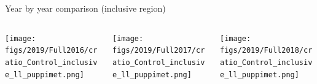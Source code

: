 \documentclass[9pt]{beamer}
\begin{document}
\begin{frame}{Year by year comparison (inclusive region)}
\begin{columns}
		\begin{column}{0.32\textwidth}
			\begin{center}
     			\texttt{[image: figs/2019/Full2016/cratio\_Control\_inclusive\_ll\_puppimet.png]}
    		\end{center}		
		\end{column} \hfill
		\begin{column}{0.32\textwidth}
			\begin{center}
     			\texttt{[image: figs/2019/Full2017/cratio\_Control\_inclusive\_ll\_puppimet.png]}
    		\end{center}		
		\end{column} \hfill
		\begin{column}{0.32\textwidth}
			\begin{center}
     			\texttt{[image: figs/2019/Full2018/cratio\_Control\_inclusive\_ll\_puppimet.png]}
   			 \end{center}
		\end{column} \hfill
	\end{columns}
\end{frame}
\end{document}
